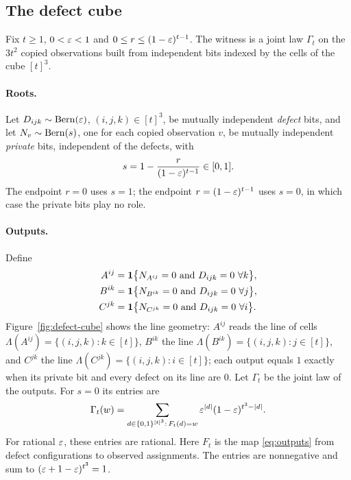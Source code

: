 \subsection{The defect cube}\label{sec:construction}

Fix $t\ge1$, $0<\varepsilon<1$ and $0\le r\le(1-\varepsilon)^{t-1}$. The witness is a joint law $\Gamma_t$ on the $3t^2$ copied observations built from independent bits indexed by the cells of the cube $[t]^3$.

\paragraph{Roots.}
Let $D_{ijk}\sim\operatorname{Bern}(\varepsilon)$, $(i,j,k)\in[t]^3$, be mutually independent \emph{defect} bits, and let $N_v\sim\operatorname{Bern}(s)$, one for each copied observation $v$, be mutually independent \emph{private} bits, independent of the defects, with
\begin{equation}\label{eq:s}
s=1-\frac{r}{(1-\varepsilon)^{t-1}}\in[0,1].
\end{equation}
The endpoint $r=0$ uses $s=1$; the endpoint $r=(1-\varepsilon)^{t-1}$ uses $s=0$, in which case the private bits play no role.

\paragraph{Outputs.}
Define
\begin{equation}\label{eq:outputs}
\begin{aligned}
A^{ij}&=\mathbf 1\bigl\{N_{A^{ij}}=0\text{ and }D_{ijk}=0\ \forall k\bigr\},\\
B^{ik}&=\mathbf 1\bigl\{N_{B^{ik}}=0\text{ and }D_{ijk}=0\ \forall j\bigr\},\\
C^{jk}&=\mathbf 1\bigl\{N_{C^{jk}}=0\text{ and }D_{ijk}=0\ \forall i\bigr\}.
\end{aligned}
\end{equation}
Figure~\ref{fig:defect-cube} shows the line geometry: $A^{ij}$ reads the line of cells $\Lambda(A^{ij})=\{(i,j,k):k\in[t]\}$, $B^{ik}$ the line $\Lambda(B^{ik})=\{(i,j,k):j\in[t]\}$, and $C^{jk}$ the line $\Lambda(C^{jk})=\{(i,j,k):i\in[t]\}$; each output equals $1$ exactly when its private bit and every defect on its line are $0$. Let $\Gamma_t$ be the joint law of the outputs. For $s=0$ its entries are
\begin{equation}\label{eq:table}
\Gamma_t(w)=\sum_{d\in\{0,1\}^{[t]^3}:\,F_t(d)=w}\varepsilon^{|d|}(1-\varepsilon)^{t^3-|d|}.
\end{equation}
For rational $\varepsilon$, these entries are rational. Here $F_t$ is the map \eqref{eq:outputs} from defect configurations to observed assignments. The entries are nonnegative and sum to $(\varepsilon+1-\varepsilon)^{t^3}=1$.

